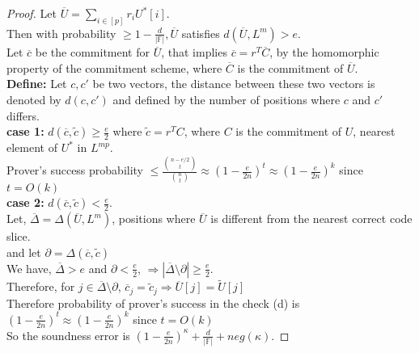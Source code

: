  \begin{proof}
 	Let $\overline{U}= \sum\limits_{i\in[p]}r_iU^{*}[i]$.\\
	Then with probability $\geq 1-\frac{d}{|\mathbb{F}|}, \overline{U}$ satisfies $d(\overline{U},L^m)>e$.\\
	Let $\overline{c}$ be the commitment for $\overline{U}$, that implies $\overline{c}=r^T\overline{C}$, by the homomorphic property of the commitment scheme, where $\overline{C}$ is the commitment of $\overline{U}$.\\
	\textbf{Define: } Let $c,c'$ be two vectors, the distance between these two vectors is denoted by $d(c,c')$ and defined by the number of positions where $c$ and $c'$ differs.\\
	\textbf{case 1:} $d(\overline{c},\tilde{c})\geq \frac{e}{2}$ where $\tilde{c}= r^TC$, where $C$ is the commitment of $U$, nearest element of $U^*$ in $L^{mp}$.\\
	Prover's success probability $\leq \frac{\binom{n-e/2}{t}}{\binom{n}{t}}\approx(1-\frac{e}{2n})^t\approx(1-\frac{e}{2n})^k$ since $t=O(k)$\\
	\textbf{case 2:} $d(\overline{c},\tilde{c})< \frac{e}{2}$.\\
	Let, $\overline{\Delta}=\Delta(\overline{U}, L^m)$, positions where $\overline{U}$ is different from the nearest correct code slice.\\
	and let $\partial=\Delta(\overline{c},\tilde{c})$\\
	We have, $\overline{\Delta}>e$ and $\partial<\frac{e}{2}$, 
	$\Rightarrow |\overline{\Delta}\setminus \partial| \geq \frac{e}{2}$.\\
	Therefore, for $j\in \overline{\Delta}\setminus \partial$, $\overline{c}_j=\tilde{c}_j \Rightarrow \overline{U}[j]=\widetilde{U}[j]$\\
	Therefore probability of prover's success in the check (d) is $(1-\frac{e}{2n})^t\approx(1-\frac{e}{2n})^k$ since $t=O(k)$\\
	So the soundness error is $(1-\frac{e}{2n})^{\kappa}+\frac{d}{|\mathbb{F}|}+neg(\kappa)$.
 \end{proof}
 
 
